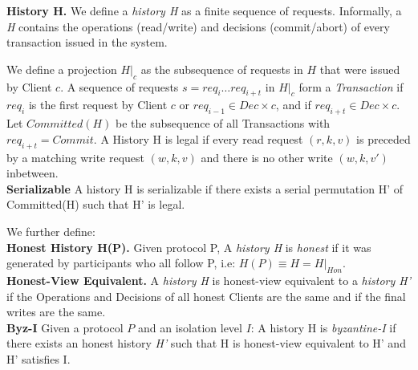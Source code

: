 \textbf{History H.} We define a \textit{history H} as a finite sequence of requests. Informally, a \textit{H} contains the operations (read/write) and decisions (commit/abort) of every transaction issued in the system.





We define a projection $H|_c$ as the subsequence of requests in $H$ that were issued by Client $c$. A sequence of requests $s = req_i \dots req_{i+t}$ in $H|_c$ form a \textit{Transaction} if $req_i$ is the first request by Client $c$ or $req_{i-1} \in Dec \times c$, and if $req_{i+t} \in Dec \times c$. Let $Committed(H)$ be the subsequence of all Transactions with $req_{i+t} = Commit$. A History H is legal if every read request $(r, k, v)$ is preceded by a matching write request $(w, k, v)$ and there is no other write $(w, k, v')$ inbetween.\\
\textbf{Serializable}  
A history H is serializable if there exists a serial permutation H' of Committed(H) such that H' is legal.

We further define:\\
\textbf{Honest History H(P).} Given protocol P, A \textit{history H} is \textit{honest} if it was generated by participants who all follow P, i.e: $H(P) \equiv H = H|_{Hon}$.\\
\textbf{Honest-View Equivalent.} A \textit{history H} is honest-view equivalent to a \textit{history H'} if the Operations and Decisions of all honest Clients are the same and if the final writes are the same.\\
\textbf{Byz-I} Given a protocol $P$ and an isolation level $I$:
A history H is \textit{byzantine-I} if there exists an honest history \textit{H'} such that H is honest-view equivalent to H' and H' satisfies I. \\

